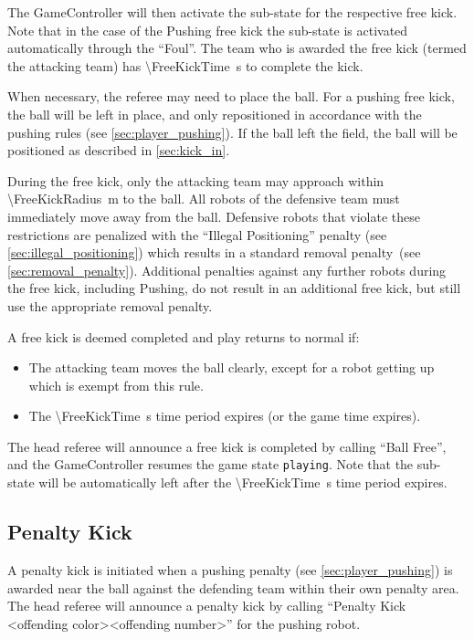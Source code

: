 The GameController will then activate the sub-state for the respective free kick.
Note that in the case of the Pushing free kick the sub-state is activated automatically through the ``Foul''.
The team who is awarded the free kick (termed the attacking team) has \qty{\FreeKickTime}{\second} to complete the kick.

When necessary, the referee may need to place the ball.
For a pushing free kick, the ball will be left in place, and only repositioned in accordance with the pushing rules (see \cref{sec:player_pushing}).
If the ball left the field, the ball will be positioned as described in \cref{sec:kick_in}.

During the free kick, only the attacking team may approach within \qty{\FreeKickRadius}{\metre} to the ball.
All robots of the defensive team must immediately move away from the ball.
Defensive robots that violate these restrictions are penalized with the ``Illegal Positioning'' penalty (see \cref{sec:illegal_positioning}) which results in a standard removal penalty~(see \cref{sec:removal_penalty}).
Additional penalties against any further robots during the free kick, including Pushing, do not result in an additional free kick, but still use the appropriate removal penalty.

A free kick is deemed completed and play returns to normal if:
\begin{itemize}
  \item The attacking team moves the ball clearly, except for a robot getting up which is exempt from this rule.
  \item The \qty{\FreeKickTime}{\second} time period expires (or the game time expires).
\end{itemize}
The head referee will announce a free kick is completed by calling ``Ball Free'', and the GameController resumes the game state \texttt{playing}.
Note that the sub-state will be automatically left after the \qty{\FreeKickTime}{\second} time period expires.

\subsection{Penalty Kick}
\label{sec:penalty_kick}

A penalty kick is initiated when a pushing penalty (see \cref{sec:player_pushing}) is awarded near the ball against the defending team within their own penalty area.
The head referee will announce a penalty kick by calling ``Penalty Kick \textless offending color\textgreater \textless offending number\textgreater'' for the pushing robot.

